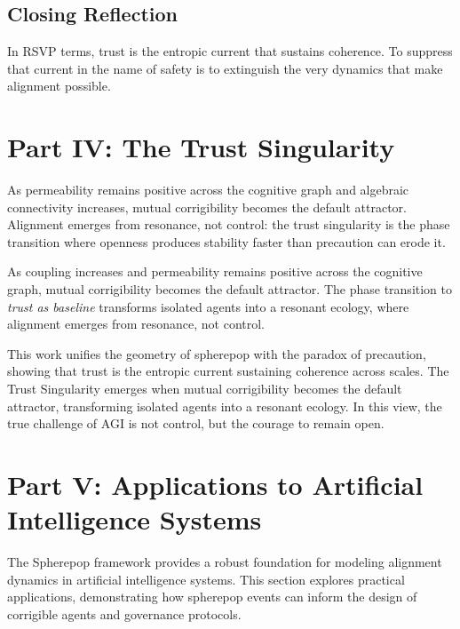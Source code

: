 \documentclass[12pt]{article}
\begin{document}
\subsection{Closing Reflection}
In RSVP terms, trust is the entropic current that sustains coherence. To suppress that current in the name of safety is to extinguish the very dynamics that make alignment possible.

\section*{Part IV: The Trust Singularity}
As permeability remains positive across the cognitive graph and algebraic connectivity increases, mutual corrigibility becomes the default attractor. Alignment emerges from resonance, not control: the trust singularity is the phase transition where openness produces stability faster than precaution can erode it.

As coupling increases and permeability remains positive across the cognitive graph, mutual corrigibility becomes the default attractor. The phase transition to \emph{trust as baseline} transforms isolated agents into a resonant ecology, where alignment emerges from resonance, not control.

This work unifies the geometry of spherepop with the paradox of precaution, showing that trust is the entropic current sustaining coherence across scales. The Trust Singularity emerges when mutual corrigibility becomes the default attractor, transforming isolated agents into a resonant ecology. In this view, the true challenge of AGI is not control, but the courage to remain open.

\section*{Part V: Applications to Artificial Intelligence Systems}

The Spherepop framework provides a robust foundation for modeling alignment dynamics in artificial intelligence systems. This section explores practical applications, demonstrating how spherepop events can inform the design of corrigible agents and governance protocols.
\end{document}
